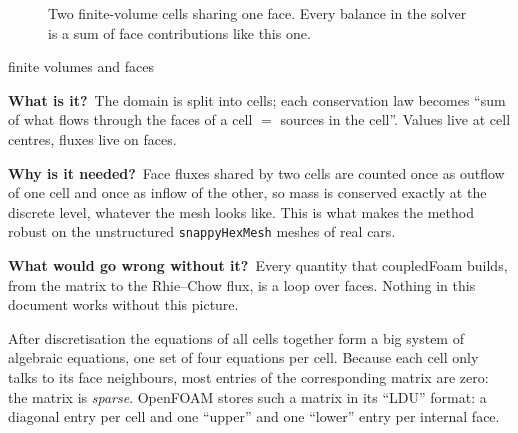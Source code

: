 \documentclass[11pt,a4paper]{article}
\newcommand{\vect}[1]{\mathbf{#1}}
\newcommand{\code}[1]{\texttt{#1}}
\newcommand{\bbwhat}{\par\smallskip\noindent\textbf{What is it?}\ }
\newcommand{\bbwhy}{\par\smallskip\noindent\textbf{Why is it needed?}\ }
\newcommand{\bbwithout}{\par\smallskip\noindent\textbf{What would go wrong
  without it?}\ }
\begin{document}
\begin{figure}[tbp]
\centering
{}
\caption{Two finite-volume cells sharing one face. Every balance in the
solver is a sum of face contributions like this one.}
\label{fig:fv}
\end{figure}

\begin{bblock}{finite volumes and faces}
\bbwhat The domain is split into cells; each conservation law becomes ``sum
of what flows through the faces of a cell $=$ sources in the cell''. Values
live at cell centres, fluxes live on faces.
\bbwhy Face fluxes shared by two cells are counted once as outflow of one
cell and once as inflow of the other, so mass is conserved exactly at the
discrete level, whatever the mesh looks like. This is what makes the
method robust on the unstructured \code{snappyHexMesh} meshes of real cars.
\bbwithout Every quantity that coupledFoam builds, from the matrix to the
Rhie--Chow flux, is a loop over faces. Nothing in this document works
without this picture.
\end{bblock}

After discretisation the equations of all cells together form a big system
of algebraic equations, one set of four equations per cell. Because each
cell only talks to its face neighbours, most entries of the corresponding
matrix are zero: the matrix is \emph{sparse}. OpenFOAM stores such a matrix
in its ``LDU'' format: a diagonal entry per cell and one ``upper'' and one
``lower'' entry per internal face.
\end{document}

